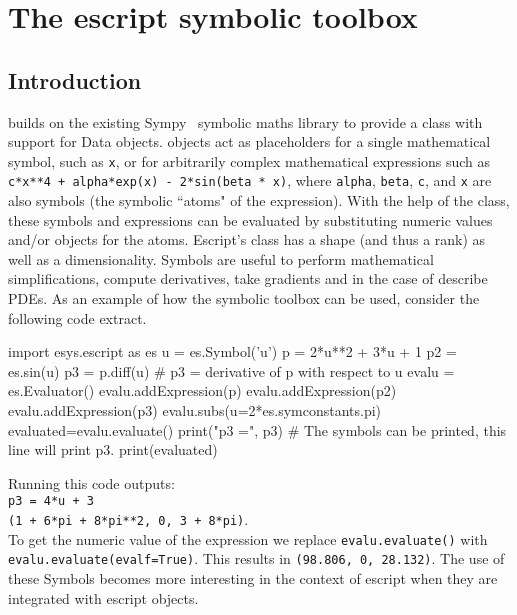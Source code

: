 
%
%
%

\chapter{The escript symbolic toolbox}
\label{CHAP:Symbolic}
\section{Introduction}
\escript builds on the existing Sympy~\cite{Sympy} symbolic maths library to
provide a \SYMBOL class with support for \escript Data objects. \SYMBOL objects
act as placeholders for a single mathematical symbol, such as \texttt{x}, or
for arbitrarily complex mathematical expressions such as
\texttt{c*x**4 + alpha*exp(x) - 2*sin(beta * x)}, where \texttt{alpha},
\texttt{beta}, \texttt{c}, and \texttt{x} are also symbols (the symbolic
``atoms" of the expression).
With the help of the \EVALUATOR class, these symbols and expressions can
be evaluated by substituting numeric values and/or \escript \Data objects
for the atoms. Escript's \SYMBOL class has a shape (and thus a rank) as well
as a dimensionality.
Symbols are useful to perform mathematical simplifications, compute
derivatives, take gradients and in the case of \escript describe PDEs.
As an example of how the symbolic toolbox can be used, consider the following
code extract.
\begin{python}
import esys.escript as es
u = es.Symbol('u')
p = 2*u**2 + 3*u + 1
p2 = es.sin(u)
p3 = p.diff(u)              # p3 = derivative of p with respect to u
evalu = es.Evaluator()
evalu.addExpression(p)
evalu.addExpression(p2)
evalu.addExpression(p3)
evalu.subs(u=2*es.symconstants.pi)
evaluated=evalu.evaluate()
print("p3 =", p3)            # The symbols can be printed, this line will print p3.
print(evaluated)
\end{python}
Running this code outputs:\\\texttt{p3 = 4*u + 3\\(1 + 6*pi + 8*pi**2, 0, 3 + 8*pi)}.\\
To get the numeric value of the expression we replace \texttt{evalu.evaluate()}
with \texttt{evalu.evaluate(evalf=True)}. This results in
\texttt{(98.806, 0, 28.132)}.
The use of these Symbols becomes more interesting in the context of escript
when they are integrated with escript \Data objects.

